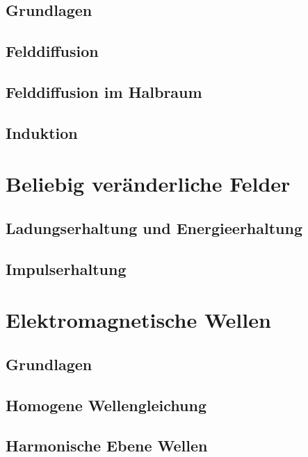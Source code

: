 \subsection{Grundlagen}

\subsection{Felddiffusion}

\subsection{Felddiffusion im Halbraum}

\subsection{Induktion}

\section{Beliebig veränderliche Felder}
\subsection{Ladungserhaltung und Energieerhaltung}

\subsection{Impulserhaltung}

\section{Elektromagnetische Wellen}
\subsection{Grundlagen}

\subsection{Homogene Wellengleichung}

\subsection{Harmonische Ebene Wellen}

